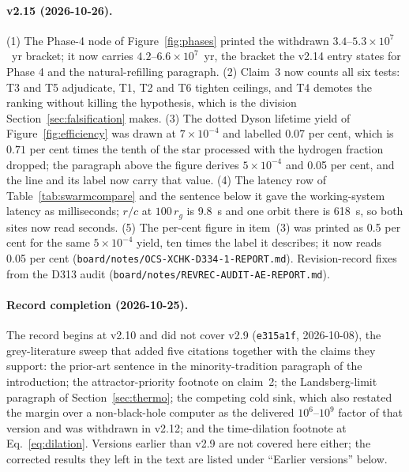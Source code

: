 \documentclass[11pt]{article}
\begin{document}
\paragraph{v2.15 (2026-10-26).} (1) The Phase-4 node of Figure~\ref{fig:phases} printed the withdrawn $3.4$--$5.3\times10^{7}$~yr bracket; it now carries $4.2$--$6.6\times10^{7}$~yr, the bracket the v2.14 entry states for Phase 4 and the natural-refilling paragraph. (2) Claim~3 now counts all six tests: T3 and T5 adjudicate, T1, T2 and T6 tighten ceilings, and T4 demotes the ranking without killing the hypothesis, which is the division Section~\ref{sec:falsification} makes. (3) The dotted Dyson lifetime yield of Figure~\ref{fig:efficiency} was drawn at $7\times10^{-4}$ and labelled 0.07 per cent, which is $0.71$ per cent times the tenth of the star processed with the hydrogen fraction dropped; the paragraph above the figure derives $5\times10^{-4}$ and 0.05 per cent, and the line and its label now carry that value. (4) The latency row of Table~\ref{tab:swarmcompare} and the sentence below it gave the working-system latency as milliseconds; $r/c$ at $100\,r_g$ is 9.8~s and one orbit there is 618~s, so both sites now read seconds. (5) The per-cent figure in item~(3) was printed as 0.5 per cent for the same $5\times10^{-4}$ yield, ten times the label it describes; it now reads 0.05 per cent (\texttt{board/notes/OCS-XCHK-D334-1-REPORT.md}). Revision-record fixes from the D313 audit (\texttt{board/notes/REVREC-AUDIT-AE-REPORT.md}).

\paragraph{Record completion (2026-10-25).} The record begins at v2.10 and did not cover v2.9 (\texttt{e315a1f}, 2026-10-08), the grey-literature sweep that added five citations together with the claims they support: the \citet{Lefebvre2000} prior-art sentence in the minority-tradition paragraph of the introduction; the \citet{Kriger2026} attractor-priority footnote on claim~2; the \citet{Wright2023Landsberg} Landsberg-limit paragraph of Section~\ref{sec:thermo}; the \citet{Garrett2026Slysh} competing cold sink, which also restated the margin over a non-black-hole computer as the delivered $10^{6}$--$10^{9}$ factor of that version and was withdrawn in v2.12; and the \citet{ReissFeng2026} time-dilation footnote at Eq.~\ref{eq:dilation}. Versions earlier than v2.9 are not covered here either; the corrected results they left in the text are listed under ``Earlier versions'' below.
\end{document}
